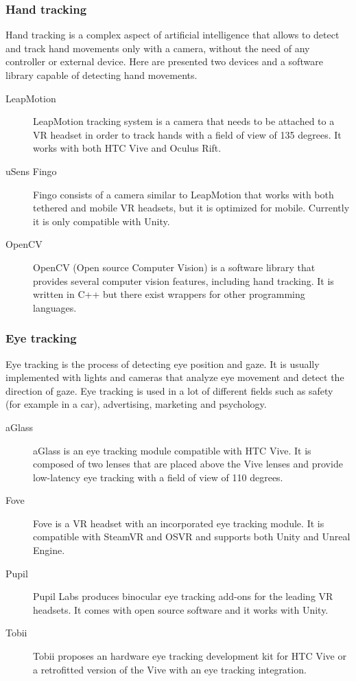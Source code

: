 \documentclass[binding=0.6cm,LaM]{sapthesis}
\begin{document}
\subsubsection{Hand tracking}
Hand tracking is a complex aspect of artificial intelligence that allows to detect and track hand movements only with a camera, without the need of any controller or external device. Here are presented two devices and a software library capable of detecting hand movements.

\begin{description}

\item[LeapMotion]
LeapMotion tracking system is a camera that needs to be attached to a VR headset in order to track hands with a field of view of 135 degrees. It works with both HTC Vive and Oculus Rift.

\item[uSens Fingo]
Fingo consists of a camera similar to LeapMotion that works with both tethered and mobile VR headsets, but it is optimized for mobile. Currently it is only compatible with Unity.

\item[OpenCV]
OpenCV (Open source Computer Vision) is a software library that provides several computer vision features, including hand tracking. It is written in C++ but there exist wrappers for other programming languages.

\end{description}

\subsubsection{Eye tracking}
Eye tracking is the process of detecting eye position and gaze. It is usually implemented with lights and cameras that analyze eye movement and detect the direction of gaze. Eye tracking is used in a lot of different fields such as safety (for example in a car), advertising, marketing and psychology.

\begin{description}

\item[aGlass]
aGlass is an eye tracking module compatible with HTC Vive. It is composed of two lenses that are placed above the Vive lenses and provide low-latency eye tracking with a field of view of 110 degrees.

\item[Fove]
Fove is a VR headset with an incorporated eye tracking module. It is compatible with SteamVR and OSVR and supports both Unity and Unreal Engine.

\item[Pupil]
Pupil Labs produces binocular eye tracking add-ons for the leading VR headsets. It comes with open source software and it works with Unity. 

\item[Tobii]
Tobii proposes an hardware eye tracking development kit for HTC Vive or a retrofitted version of the Vive with an eye tracking integration. 

\end{description}
\end{document}
